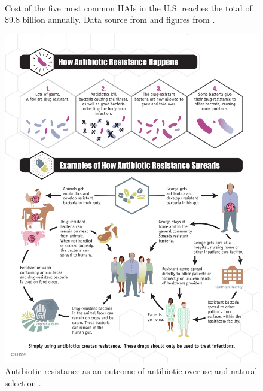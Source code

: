 \begin{figure}
	\centering
	~
	\caption{Cost of the five most common HAIs in the U.S. reaches the total of \$9.8 billion annually. Data source from \cite{zimlichman2013health} and figures from \cite{center}.}
	\label{money}
\end{figure}


\begin{figure}
	\centering
	\includegraphics[width=.7\textwidth]{./img/evol.pdf}
	\caption{Antibiotic resistance as an outcome of antibiotic overuse and natural selection \cite{resistance}.}
	\label{evol}
\end{figure}



